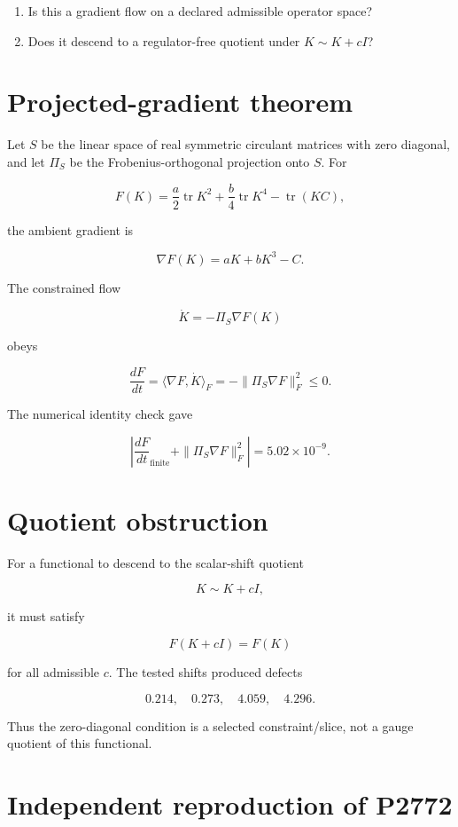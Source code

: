 \documentclass[11pt,a4paper,openany]{report}
\begin{document}
\begin{enumerate}
\item 
Is this a gradient flow on a declared admissible operator space?

\item 
Does it descend to a regulator-free quotient under \(K\sim K+cI\)?

\end{enumerate}

\section{Projected-gradient theorem}

Let \(S\) be the linear space of real symmetric circulant matrices with zero diagonal, and let \(\Pi_S\) be the Frobenius-orthogonal projection onto \(S\). For

\[
F(K)
=
\frac a2\operatorname{tr}K^2
+\frac b4\operatorname{tr}K^4
-\operatorname{tr}(KC),
\]

the ambient gradient is

\[
\nabla F(K)=aK+bK^3-C.
\]

The constrained flow

\[
\dot K=-\Pi_S\nabla F(K)
\]

obeys

\[
\frac{dF}{dt}
=
\langle\nabla F,\dot K\rangle_F
=
-\|\Pi_S\nabla F\|_F^2
\le0.
\]

The numerical identity check gave

\[
\left|
\frac{dF}{dt}_{\mathrm{finite}}
+\|\Pi_S\nabla F\|_F^2
\right|
=5.02\times10^{-9}.
\]

\section{Quotient obstruction}

For a functional to descend to the scalar-shift quotient

\[
K\sim K+cI,
\]

it must satisfy

\[
F(K+cI)=F(K)
\]

for all admissible \(c\). The tested shifts produced defects

\[
0.214,\quad0.273,\quad4.059,\quad4.296.
\]

Thus the zero-diagonal condition is a selected constraint/\allowbreak{}slice, not a gauge quotient of this functional.

\section{Independent reproduction of P2772}
\end{document}
